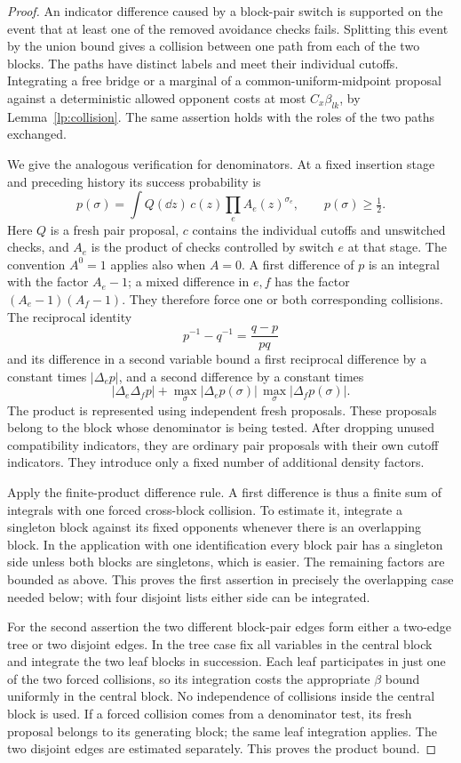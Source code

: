 \begin{proof}
An indicator difference caused by a block-pair switch is supported
on the event that at least one of the removed avoidance checks fails.
Splitting this event by the union bound gives a collision between
one path from each of the two blocks.  The paths have distinct labels
and meet their individual cutoffs.  Integrating a free bridge or a
marginal of a common-uniform-midpoint proposal against a deterministic
allowed opponent costs at most $C_x\beta_{lk}$, by
Lemma~\ref{lp:collision}.  The same assertion holds with the roles
of the two paths exchanged.

We give the analogous verification for denominators.  At a fixed
insertion stage and preceding history its success probability is
\[
 p(\sigma)=\int Q(\dd z)\,c(z)\prod_e A_e(z)^{\sigma_e},
 \qquad p(\sigma)\ge\tfrac12.
\]
Here $Q$ is a fresh pair proposal, $c$ contains the individual cutoffs
and unswitched checks, and $A_e$ is the product of checks controlled
by switch $e$ at that stage.  The convention $A^0=1$ applies also
when $A=0$.  A first difference of $p$ is an integral with the factor
$A_e-1$; a mixed difference in $e,f$ has the factor
$(A_e-1)(A_f-1)$.  They therefore force one or both corresponding
collisions.  The reciprocal identity
\[
          p^{-1}-q^{-1}=\frac{q-p}{pq}
\]
and its difference in a second variable bound a first reciprocal
difference by a constant times $|\Delta_ep|$, and a second difference
by a constant times
\[
 |\Delta_e\Delta_fp|
 +\max_{\sigma}|\Delta_ep(\sigma)|\,
       \max_{\sigma}|\Delta_fp(\sigma)|.
\]
The product is represented using independent fresh proposals.  These
proposals belong to the block whose denominator is being tested.
After dropping unused compatibility indicators, they are ordinary
pair proposals with their own cutoff indicators.  They introduce only
a fixed number of additional density factors.

Apply the finite-product difference rule.  A first difference is
thus a finite sum of integrals with one forced cross-block collision.
To estimate it, integrate a singleton block against its fixed
opponents whenever there is an overlapping block.  In the application
with one identification every block pair has a singleton side unless
both blocks are singletons, which is easier.  The remaining factors
are bounded as above.  This proves the first assertion in precisely
the overlapping case needed below; with four disjoint lists either
side can be integrated.

For the second assertion the two different block-pair edges form
either a two-edge tree or two disjoint edges.  In the tree case fix
all variables in the central block and integrate the two leaf blocks
in succession.  Each leaf participates in just one of the two forced
collisions, so its integration costs the appropriate $\beta$ bound
uniformly in the central block.  No independence of collisions inside
the central block is used.  If a forced collision comes from a
denominator test, its fresh proposal belongs to its generating block;
the same leaf integration applies.  The two disjoint edges are
estimated separately.  This proves the product bound.


\end{proof}
